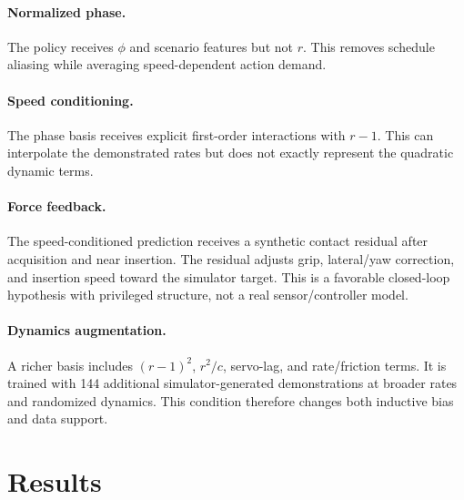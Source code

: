 \documentclass[11pt]{article}
\begin{document}
\paragraph{Normalized phase.}
The policy receives $\phi$ and scenario features but not $r$. This removes schedule aliasing while averaging speed-dependent action demand.

\paragraph{Speed conditioning.}
The phase basis receives explicit first-order interactions with $r-1$. This can interpolate the demonstrated rates but does not exactly represent the quadratic dynamic terms.

\paragraph{Force feedback.}
The speed-conditioned prediction receives a synthetic contact residual after acquisition and near insertion. The residual adjusts grip, lateral/yaw correction, and insertion speed toward the simulator target. This is a favorable closed-loop hypothesis with privileged structure, not a real sensor/controller model.

\paragraph{Dynamics augmentation.}
A richer basis includes $(r-1)^2$, $r^2/c$, servo-lag, and rate/friction terms. It is trained with 144 additional simulator-generated demonstrations at broader rates and randomized dynamics. This condition therefore changes both inductive bias and data support.

\section{Results}
\end{document}
